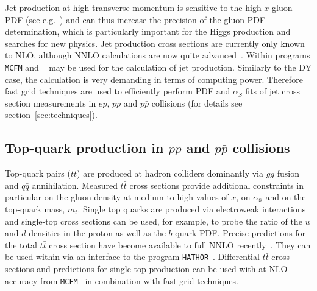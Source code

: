 Jet production at high transverse momentum is sensitive to the high-$x$ gluon 
PDF (see e.g.~\cite{MSTWpdf}) and can thus increase the precision of the 
gluon PDF determination, which is particularly important for the Higgs production and searches for new physics.
Jet production cross sections are currently only known to NLO, although NNLO 
calculations are now quite advanced~\cite{nigel:2013,nigel:2010,Currie:2013dwa}. 
Within \fitter programs \texttt{MCFM} and 
\nlojetpp~\cite{Nagy:1998bb,Nagy:2001fj} may be used for the 
calculation of jet production.
Similarly to the DY case, the calculation 
is very demanding in terms of computing power. 
Therefore fast grid techniques are used to efficiently perform PDF and
$\alpha_S$ fits of jet cross section measurements in $ep$, $pp$ and
$p\bar{p}$ collisions
(for details see section~\ref{sec:techniques}).





\subsection{Top-quark production in $pp$ and $p \bar p$ collisions}

Top-quark pairs ($t \bar t$) are produced at hadron colliders dominantly via $gg$ fusion 
and $q \bar q$ annihilation. Measured $t \bar t$ cross sections provide additional 
constraints in particular on the gluon density at medium to high values of $x$, 
on $\alpha_\mathrm{s}$ and on the top-quark mass, $m_t$. 
Single top quarks are produced via electroweak interactions and single-top cross sections 
can be used, for example, to probe the ratio of the $u$ and $d$ densities in the proton 
as well as the $b$-quark PDF.
Precise predictions for the total $t \bar t$ cross section have become available 
to full NNLO recently~\cite{Czakon:2013goa}. They can be used within \fitter via an interface 
to the program \texttt{HATHOR}~\cite{Aliev:2010zk}. Differential $t \bar t$ cross sections and predictions 
for single-top production can be used with \fitter at NLO accuracy from 
\texttt{MCFM}~\cite{Campbell:2010ff,Campbell:2009ss,Campbell:2005bb,Campbell:2004ch,Campbell:2012uf} 
in combination with fast grid techniques.

